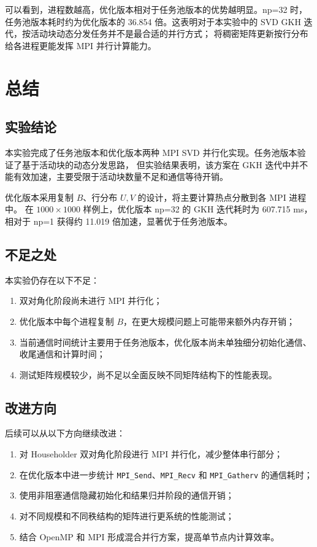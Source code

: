 \documentclass[UTF8,a4paper,10pt]{ctexart}
\begin{document}
可以看到，进程数越高，优化版本相对于任务池版本的优势越明显。np=32 时，任务池版本耗时约为优化版本的
36.854 倍。这表明对于本实验中的 SVD GKH 迭代，按活动块动态分发任务并不是最合适的并行方式；
将稠密矩阵更新按行分布给各进程更能发挥 MPI 并行计算能力。

\section{总结}

\subsection{实验结论}
本实验完成了任务池版本和优化版本两种 MPI SVD 并行化实现。任务池版本验证了基于活动块的动态分发思路，
但实验结果表明，该方案在 GKH 迭代中并不能有效加速，主要受限于活动块数量不足和通信等待开销。

优化版本采用复制 $B$、行分布 $U,V$ 的设计，将主要计算热点分散到各 MPI 进程中。
在 $1000\times 1000$ 样例上，优化版本 np=32 的 GKH 迭代耗时为 607.715 ms，
相对于 np=1 获得约 11.019 倍加速，显著优于任务池版本。

\subsection{不足之处}
本实验仍存在以下不足：
\begin{enumerate}
  \item 双对角化阶段尚未进行 MPI 并行化；
  \item 优化版本中每个进程复制 $B$，在更大规模问题上可能带来额外内存开销；
  \item 当前通信时间统计主要用于任务池版本，优化版本尚未单独细分初始化通信、收尾通信和计算时间；
  \item 测试矩阵规模较少，尚不足以全面反映不同矩阵结构下的性能表现。
\end{enumerate}

\subsection{改进方向}
后续可以从以下方向继续改进：
\begin{enumerate}
  \item 对 Householder 双对角化阶段进行 MPI 并行化，减少整体串行部分；
  \item 在优化版本中进一步统计 \verb|MPI_Send|、\verb|MPI_Recv| 和 \verb|MPI_Gatherv| 的通信耗时；
  \item 使用非阻塞通信隐藏初始化和结果归并阶段的通信开销；
  \item 对不同规模和不同秩结构的矩阵进行更系统的性能测试；
  \item 结合 OpenMP 和 MPI 形成混合并行方案，提高单节点内计算效率。
\end{enumerate}
\end{document}
